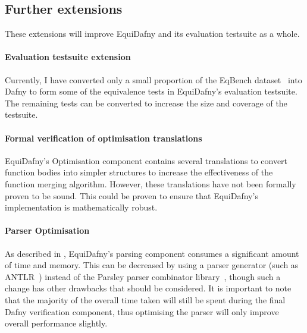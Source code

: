 \subsection{Further extensions}

These extensions will improve EquiDafny and its evaluation testsuite as a whole. 

\paragraph{Evaluation testsuite extension} Currently, I have converted only a small proportion of the EqBench dataset~\parencite{badihiEqBenchDatasetEquivalent2021} into Dafny to form some of the equivalence tests in EquiDafny's evaluation testsuite. The remaining tests can be converted to increase the size and coverage of the testsuite.

\paragraph{Formal verification of optimisation translations} EquiDafny's Optimisation component contains several translations to convert function bodies into simpler structures to increase the effectiveness of the function merging algorithm. However, these translations have not been formally proven to be sound. This could be proven to ensure that EquiDafny's implementation is mathematically robust.

\paragraph{Parser Optimisation} As described in , EquiDafny's parsing component consumes a significant amount of time and memory. This can be decreased by using a parser generator (such as ANTLR~\parencite{DefinitiveANTLR4}) instead of the Parsley parser combinator library~\parencite{willisJmie6Parsley2026}, though such a change has other drawbacks that should be considered. It is important to note that the majority of the overall time taken will still be spent during the final Dafny verification component, thus optimising the parser will only improve overall performance slightly.
